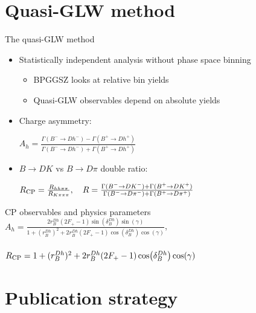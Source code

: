 \documentclass{beamer}
\begin{document}
\section{Quasi-GLW method}

\begin{frame}{The quasi-GLW method}
  \begin{itemize}
    \setlength\itemsep{0.5em}
    \item{Statistically independent analysis without phase space binning}
    \begin{itemize}
      \item{BPGGSZ looks at relative bin yields}
      \item{Quasi-GLW observables depend on absolute yields}
    \end{itemize}
    \item{Charge asymmetry:}
    \begin{center}
      $A_h = \frac{\Gamma(B^-\to D h^-) - \Gamma(B^+\to D h^+)}{\Gamma(B^-\to D h^-) + \Gamma(B^+\to D h^+)}$
    \end{center}
    \item{$B\to DK$ vs $B\to D\pi$ double ratio:}
    \begin{center}
      $R_{\rm CP} = \frac{R_{hh\pi\pi}}{R_{K\pi\pi\pi}}, \quad R = \frac{\Gamma(B^-\to D K^-) + \Gamma(B^+\to D K^+)}{\Gamma(B^-\to D\pi^-) + \Gamma(B^+\to D\pi^+)}$
    \end{center}
  \end{itemize}
  \begin{block}{CP observables and physics parameters}
    $A_h = \frac{2r_B^{Dh}(2F_+ - 1)\sin(\delta_B^{Dh})\sin(\gamma)}{1 + (r_B^{Dh})^2 + 2r_B^{Dh}(2F_+ - 1)\cos(\delta_B^{Dh})\cos(\gamma)}$, \\~\\
    $R_{\rm CP} = 1 + (r_B^{Dh})^2 + 2r_B^{Dh}(2F_+ - 1)\cos(\delta_B^{Dh})\cos(\gamma)$
  \end{block}
\end{frame}

\section{Publication strategy}
\end{document}
